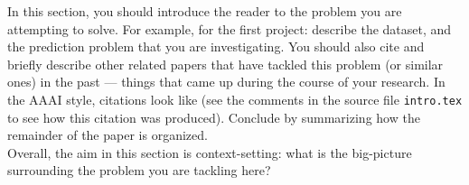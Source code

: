 In this section, you should introduce the reader to the problem you
are attempting to solve. For example, for the first project: describe
the dataset, and the prediction problem that you are
investigating. You should also cite and briefly describe other related
papers that have tackled this problem (or similar ones) in the past
--- things that came up during the course of your research. In the
AAAI style, citations look like \cite{aima} (see the comments in the
source file \texttt{intro.tex} to see how this citation was
produced). Conclude by summarizing how the
remainder of the paper is organized. \\


Overall, the aim in this section is context-setting: what is the
big-picture surrounding the problem you are tackling here?

